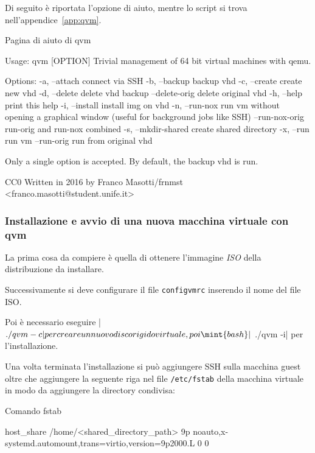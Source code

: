 \documentclass[10pt,titlepage,twoside,a4paper]{report}
\newenvironment{code}{\singlespacing\captionsetup{type=listing}}{}
\begin{document}
Di seguito è riportata l'opzione di aiuto, mentre lo script si trova 
nell'appendice~\ref{app:qvm}.

\begin{code}
    \caption{Pagina di aiuto di qvm}
    \begin{textcode*}{}
Usage: qvm [OPTION]
Trivial management of 64 bit virtual machines with qemu.

Options:
    -a, --attach                connect via SSH
    -b, --backup                backup vhd
    -c, --create                create new vhd
    -d, --delete                delete vhd backup
        --delete-orig           delete original vhd
    -h, --help                  print this help
    -i, --install               install img on vhd
    -n, --run-nox               run vm without opening a graphical window
                                (useful for background jobs like SSH)
        --run-nox-orig          run-orig and run-nox combined
    -s, --mkdir-shared          create shared directory
    -x, --run                   run vm
        --run-orig              run from original vhd


Only a single option is accepted.
By default, the backup vhd is run.

CC0
Written in 2016 by Franco Masotti/frnmst <franco.masotti@student.unife.it>
    \end{textcode*}
\end{code}

\subsubsection{Installazione e avvio di una nuova macchina virtuale con qvm}
La prima cosa da compiere è quella di ottenere l'immagine \emph{ISO} della 
distribuzione da installare.

Successivamente si deve configurare il file \texttt{configvmrc} inserendo il 
nome del file ISO.

Poi è necessario eseguire |$ ./qvm -c| per creare un nuovo 
disco rigido virtuale, poi \mint{bash}|$ ./qvm -i| per l'installazione.

Una volta terminata l'installazione si può aggiungere SSH sulla macchina 
guest oltre che aggiungere la seguente riga nel file \texttt{/etc/fstab} della 
macchina virtuale in modo da aggiungere la directory condivisa:

\begin{code}
   \caption{Comando fstab}
    \begin{textcode*}{}
host_share /home/<shared_directory_path> 9p noauto,x-systemd.automount,trans=virtio,version=9p2000.L 0 0
    \end{textcode*}
\end{code}
\end{document}
